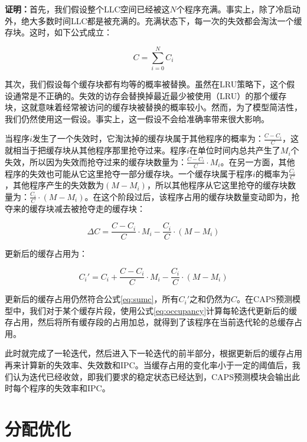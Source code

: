 \textbf{证明：}首先，我们假设整个LLC空间已经被这$N$个程序充满。事实上，除了冷启动外，绝大多数时间LLC都是被充满的。充满状态下，每一次的失效都会淘汰一个缓存块。这时，如下公式成立：

\begin{equation}
C = \sum_{i=0}^{N} C_i
\label{eq:sumc}
\end{equation}

其次，我们假设每个缓存块都有均等的概率被替换。虽然在LRU策略下，这个假设通常是不正确的。失效的访存会替换掉最近最少被使用（LRU）的那个缓存块，这就意味着经常被访问的缓存块被替换的概率较小。然而，为了模型简洁性，我们仍然使用这一假设。事实上，这一假设不会给准确率带来很大影响\parencite{west2010online}。

当程序$i$发生了一个失效时，它淘汰掉的缓存块属于其他程序的概率为：$\frac{C-C_i}{C}$，这就相当于把缓存块从其他程序那里抢夺过来。程序$i$在单位时间内总共产生了$M_i$个失效，所以因为失效而抢夺过来的缓存块数量为：$\frac{C-C_i}{C} \cdot M_i $。在另一方面，其他程序的失效也可能从它这里抢夺一部分缓存块。一个缓存块属于程序$i$的概率为$\frac{C_i}{C}$，其他程序产生的失效数为$(M-M_i)$，所以其他程序从它这里抢夺的缓存块数量为：$\frac{C_i}{C} \cdot (M-M_i)$。在这个阶段过后，该程序占用的缓存块数量变动即为，抢夺来的缓存块减去被抢夺走的缓存块：

\begin{equation}
 \Delta C = \frac{C-C_i}{C} \cdot M_i - \frac{C_i}{C} \cdot (M-M_i)
 \label{eq:deltac}
\end{equation}

更新后的缓存占用为：

\begin{equation}
 C_i' = C_i + \frac{C-C_i}{C} \cdot M_i - \frac{C_i}{C} \cdot (M-M_i)
 \label{eq:occupancy}
\end{equation}

更新后的缓存占用仍然符合公式\ref{eq:sumc}，所有$C_i'$之和仍然为$C$。在CAPS预测模型中，我们对于某个缓存片段，使用公式\ref{eq:occupancy}计算每轮迭代更新后的缓存占用，然后将所有缓存段的占用加总，就得到了该程序在当前迭代轮的总缓存占用。

此时就完成了一轮迭代，然后进入下一轮迭代的前半部分，根据更新后的缓存占用再来计算新的失效率、失效数和IPC。当缓存占用的变化率小于一定的阈值后，我们认为迭代已经收敛，即我们要求的稳定状态已经达到，CAPS预测模块会输出此时每个程序的失效率和IPC。

\section{分配优化} \label{sec:allocation}

